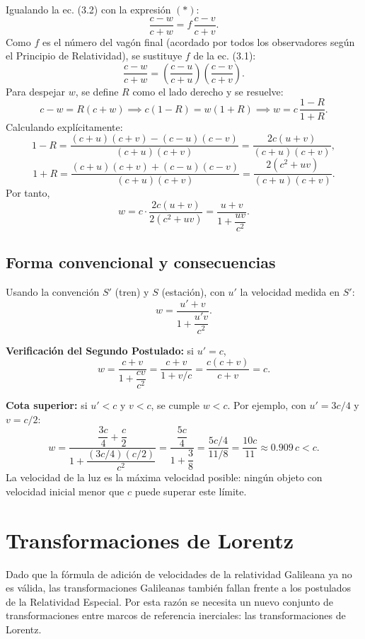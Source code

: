Igualando la ec. (3.2) con la expresión $(*)$:
$$
\frac{c - w}{c + w} = f\,\frac{c - v}{c + v}.
$$
Como $f$ es el número del vagón final (acordado por todos los observadores según el Principio de Relatividad), se sustituye $f$ de la ec. (3.1):
\begin{equation*}
    \frac{c-w}{c+w}
    =\left(\frac{c-u}{c+u}\right)
    \left(\frac{c-v}{c+v}\right).
    \tag{3.3}
\end{equation*}
Para despejar $w$, se define $R$ como el lado derecho y se resuelve:
$$
c - w = R(c + w) \implies c(1 - R) = w(1 + R) \implies w = c\,\frac{1 - R}{1 + R}.
$$
Calculando explícitamente:
$$
1 - R = \frac{(c+u)(c+v) - (c-u)(c-v)}{(c+u)(c+v)} = \frac{2c(u+v)}{(c+u)(c+v)},
$$
$$
1 + R = \frac{(c+u)(c+v) + (c-u)(c-v)}{(c+u)(c+v)} = \frac{2(c^2 + uv)}{(c+u)(c+v)}.
$$
Por tanto,
\begin{equation*}
    w=c\cdot\frac{2c(u+v)}{2(c^2+uv)}
    =\frac{u+v}{1+\dfrac{uv}{c^2}}.
    \tag{3.4}
\end{equation*}

\subsection{Forma convencional y consecuencias}

Usando la convención $S'$ (tren) y $S$ (estación), con $u'$ la velocidad medida en $S'$:
\begin{equation*}
    w=\frac{u'+v}{1+\dfrac{u'v}{c^2}}.
    \tag{3.5}
\end{equation*}

\textbf{Verificación del Segundo Postulado:} si $u' = c$,
$$
w = \frac{c + v}{1 + \dfrac{cv}{c^2}} = \frac{c + v}{1 + v/c} = \frac{c(c + v)}{c + v} = c.
$$

\textbf{Cota superior:} si $u' < c$ y $v < c$, se cumple $w < c$. Por ejemplo, con $u' = 3c/4$ y $v = c/2$:
$$
w = \frac{\dfrac{3c}{4} + \dfrac{c}{2}}{1 + \dfrac{(3c/4)(c/2)}{c^2}} = \frac{\dfrac{5c}{4}}{1 + \dfrac{3}{8}} = \frac{5c/4}{11/8} = \frac{10c}{11} \approx 0.909\,c < c.
$$
La velocidad de la luz es la máxima velocidad posible: ningún objeto con velocidad inicial menor que $c$ puede superar este límite.

\section{Transformaciones de Lorentz}

Dado que la fórmula de adición de velocidades de la relatividad Galileana ya no es válida, las transformaciones Galileanas también fallan frente a los postulados de la Relatividad Especial. Por esta razón se necesita un nuevo conjunto de transformaciones entre marcos de referencia inerciales: las transformaciones de Lorentz.

